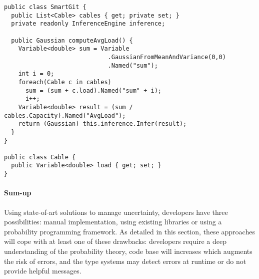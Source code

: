 \begin{lstlisting}[style=cSharpStyle, caption=Limitation using a probability programing framework (C\#), label=lst:limit-proba-prog-fw, linewidth=0.97\textwidth]
public class SmartGit {
  public List<Cable> cables { get; private set; }
  private readonly InferenceEngine inference;

  public Gaussian computeAvgLoad() {
    Variable<double> sum = Variable
                             .GaussianFromMeanAndVariance(0,0)
                             .Named("sum");
    int i = 0;
    foreach(Cable c in cables)
      sum = (sum + c.load).Named("sum" + i);
      i++;
    Variable<double> result = (sum / cables.Capacity).Named("AvgLoad");
    return (Gaussian) this.inference.Infer(result);
  }
}

public class Cable {
  public Variable<double> load { get; set; }
}
\end{lstlisting}

\paragraph{Sum-up}
Using state-of-art solutions to manage uncertainty, developers have three possibilities: manual implementation, using existing libraries or using a probability programming framework.
As detailed in this section, these approaches will cope with at least one of these drawbacks: developers require a deep understanding of the probability theory, code base will increases which augments the risk of errors, and the type systems may detect errors at runtime or do not provide helpful messages.
